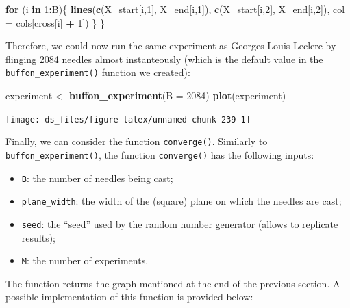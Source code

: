 \documentclass[12pt,]{krantz}
\newenvironment{Shaded}{\begin{snugshade}}{\end{snugshade}}
\newcommand{\KeywordTok}[1]{\textcolor[rgb]{0.27,0.27,0.27}{\textbf{#1}}}
\newcommand{\DataTypeTok}[1]{\textcolor[rgb]{0.27,0.27,0.27}{#1}}
\newcommand{\DecValTok}[1]{\textcolor[rgb]{0.06,0.06,0.06}{#1}}
\newcommand{\StringTok}[1]{\textcolor[rgb]{0.5,0.5,0.5}{#1}}
\newcommand{\ControlFlowTok}[1]{\textcolor[rgb]{0.27,0.27,0.27}{\textbf{#1}}}
\newcommand{\OperatorTok}[1]{\textcolor[rgb]{0.43,0.43,0.43}{\textbf{#1}}}
\newcommand{\NormalTok}[1]{#1}
\providecommand{\tightlist}{%
  \setlength{\itemsep}{0pt}\setlength{\parskip}{0pt}}
\begin{document}
\begin{Shaded}
\begin{Highlighting}[]
  \ControlFlowTok{for}\NormalTok{ (i }\ControlFlowTok{in} \DecValTok{1}\OperatorTok{:}\NormalTok{B)\{}
    \KeywordTok{lines}\NormalTok{(}\KeywordTok{c}\NormalTok{(X_start[i,}\DecValTok{1}\NormalTok{], X_end[i,}\DecValTok{1}\NormalTok{]), }\KeywordTok{c}\NormalTok{(X_start[i,}\DecValTok{2}\NormalTok{], X_end[i,}\DecValTok{2}\NormalTok{]), }
          \DataTypeTok{col =}\NormalTok{ cols[cross[i] }\OperatorTok{+}\StringTok{ }\DecValTok{1}\NormalTok{])}
\NormalTok{  \}}
\NormalTok{\}}
\end{Highlighting}
\end{Shaded}

Therefore, we could now run the same experiment as Georges-Louis Leclerc
by flinging 2084 needles almost instanteously (which is the default
value in the \texttt{buffon\_experiment()} function we created):

\begin{Shaded}
\begin{Highlighting}[]
\NormalTok{experiment <-}\StringTok{ }\KeywordTok{buffon_experiment}\NormalTok{(}\DataTypeTok{B =} \DecValTok{2084}\NormalTok{)}
\KeywordTok{plot}\NormalTok{(experiment)}
\end{Highlighting}
\end{Shaded}

\begin{center}\texttt{[image: ds\_files/figure-latex/unnamed-chunk-239-1]} \end{center}

Finally, we can consider the function \texttt{converge()}. Similarly to
\texttt{buffon\_experiment()}, the function \texttt{converge()} has the
following inputs:

\begin{itemize}
\tightlist
\item
  \texttt{B}: the number of needles being cast;
\item
  \texttt{plane\_width}: the width of the (square) plane on which the
  needles are cast;
\item
  \texttt{seed}: the ``seed'' used by the random number generator
  (allows to replicate results);
\item
  \texttt{M}: the number of experiments.
\end{itemize}

The function returns the graph mentioned at the end of the previous
section. A possible implementation of this function is provided below:
\end{document}
